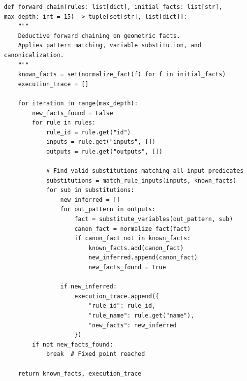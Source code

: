 \begin{lstlisting}[style=pythonstyle, caption={Hàm suy diễn tiến hình học chính (\texttt{core\_engine/solver.py})}]
def forward_chain(rules: list[dict], initial_facts: list[str], max_depth: int = 15) -> tuple[set[str], list[dict]]:
    """
    Deductive forward chaining on geometric facts.
    Applies pattern matching, variable substitution, and canonicalization.
    """
    known_facts = set(normalize_fact(f) for f in initial_facts)
    execution_trace = []
    
    for iteration in range(max_depth):
        new_facts_found = False
        for rule in rules:
            rule_id = rule.get("id")
            inputs = rule.get("inputs", [])
            outputs = rule.get("outputs", [])
            
            # Find valid substitutions matching all input predicates
            substitutions = match_rule_inputs(inputs, known_facts)
            for sub in substitutions:
                new_inferred = []
                for out_pattern in outputs:
                    fact = substitute_variables(out_pattern, sub)
                    canon_fact = normalize_fact(fact)
                    if canon_fact not in known_facts:
                        known_facts.add(canon_fact)
                        new_inferred.append(canon_fact)
                        new_facts_found = True
                        
                if new_inferred:
                    execution_trace.append({
                        "rule_id": rule_id,
                        "rule_name": rule.get("name"),
                        "new_facts": new_inferred
                    })
        if not new_facts_found:
            break  # Fixed point reached
            
    return known_facts, execution_trace
\end{lstlisting}
